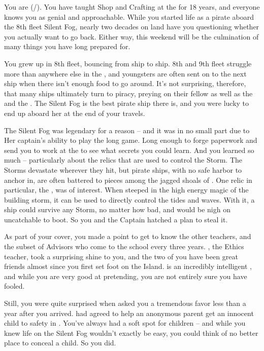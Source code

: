 \documentclass[char]{GL2020}
\begin{document}
\name{\cPirate{}}


You are \cPirate{\full} (\cPirate{\they}/\cPirate{\them}). You have taught Shop and Crafting at the \pSchool{} for 18 years, and everyone knows you as genial and approachable. While you started life as a pirate aboard the 8th fleet Silent Fog, nearly two decades on land have you questioning whether you actually want to go back. Either way, this weekend will be the culmination of many things you have long prepared for.

You grew up in 8th fleet, bouncing from ship to ship. 8th and 9th fleet struggle more than anywhere else in the \pShip{}, and youngsters are often sent on to the next ship when there isn’t enough food to go around. It’s not surprising, therefore, that many ships ultimately turn to piracy, preying on their fellow \pShippies{} as well as the \pFarm{} and the \pTech{}. The Silent Fog is the best pirate ship there is, and you were lucky to end up aboard her at the end of your travels.

The Silent Fog was legendary for a reason -- and it was in no small part due to Her captain’s ability to play the long game. Long enough to forge paperwork and send you to work at the \pSchool{} to see what secrets you could learn. And you learned so much -- particularly about the relics that are used to control the Storm. The Storms devastate wherever they hit, but pirate ships, with no safe harbor to anchor in, are often battered to pieces among the jagged shoals of \pWod{}. One relic in particular, the \iNet{}, was of interest. When steeped in the high energy magic of the building storm, it can be used to directly control the tides and waves. With it, a ship could survive any Storm, no matter how bad, and would be nigh on uncatchable to boot. So you and the Captain hatched a plan to steal it.

As part of your cover, you made a point to get to know the other teachers, and the subset of Advisors who come to the school every three years. \cEthics{}, the Ethics teacher, took a surprising shine to you, and the two of you have been great friends almost since you first set foot on the Island. \cEthics{} is an incredibly intelligent \cEthics{\person}, and while you are very good at pretending, you are not entirely sure you have \cEthics{\them} fooled.

Still, you were quite surprised when \cEthics{\they} asked you a tremendous favor less than a year after you arrived. \cEthics{} had agreed to help an anonymous parent get an innocent child to safety in \pShip{}. You’ve always had a soft spot for children -- and while you knew life on the Silent Fog wouldn’t exactly be easy, you could think of no better place to conceal a child. So you did.
\end{document}
